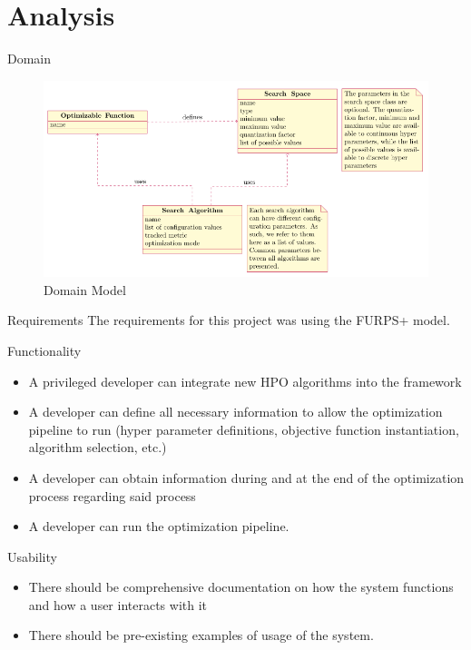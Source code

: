 \documentclass[10pt]{beamer}
\begin{document}
  \section{Analysis}
  \begin{frame}{Domain}
    \begin{figure}
      \includegraphics[width=\textwidth]{images/domain_model.png}
      \caption{Domain Model}
    \end{figure}
  \end{frame}
  \begin{frame}{Requirements}
    The requirements for this project was using the FURPS+ model.
  \end{frame}
  \begin{frame}{Functionality}
    \begin{itemize}
      \item A privileged developer can integrate new HPO algorithms into the framework
      \item A developer can define all necessary information to allow the optimization pipeline to run (hyper parameter definitions, objective function instantiation, algorithm selection, etc.)
      \item A developer can obtain information during and at the end of the optimization process regarding said process
      \item A developer can run the optimization pipeline.
    \end{itemize}
  \end{frame}
  \begin{frame}{Usability}
    \begin{itemize}
      \item There should be comprehensive documentation on how the system functions and how a user interacts with it
      \item There should be pre-existing examples of usage of the system.
    \end{itemize}
  \end{frame}
\end{document}
